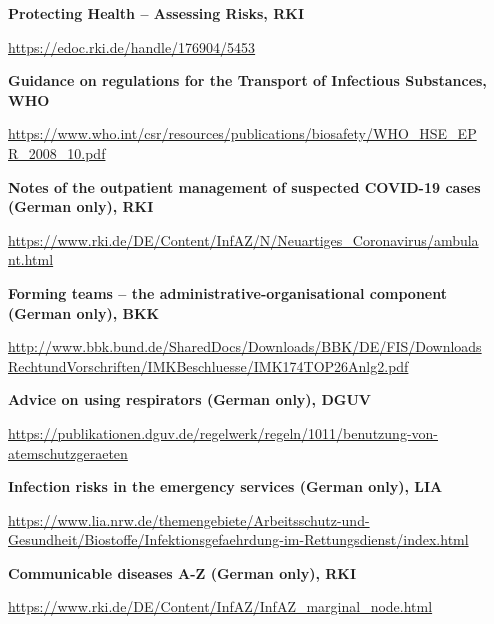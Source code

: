 \documentclass{article}
\begin{document}
\textbf{Protecting Health – Assessing Risks, RKI }


\href{https://edoc.rki.de/handle/176904/5453}{https://edoc.rki.de/handle/176904/5453}


\textbf{Guidance on regulations for the Transport of Infectious Substances, WHO}


\href{https://www.who.int/csr/resources/publications/biosafety/WHO_HSE_EPR_2008_10.pdf?ua=1}{https://www.who.int/csr/resources/publications/biosafety/WHO\_HSE\_EP} \href{https://www.who.int/csr/resources/publications/biosafety/WHO_HSE_EPR_2008_10.pdf?ua=1}{R\_2008\_10.pdf}


\textbf{Notes of the outpatient management of suspected COVID-19 cases (German only), RKI}


\href{https://www.rki.de/DE/Content/InfAZ/N/Neuartiges_Coronavirus/ambulant.html}{https://www.rki.de/DE/Content/InfAZ/N/Neuartiges\_Coronavirus/ambula} \href{https://www.rki.de/DE/Content/InfAZ/N/Neuartiges_Coronavirus/ambulant.html}{nt.html}


\textbf{Forming teams – the administrative-organisational component (German only), BKK}


\href{http://www.bbk.bund.de/SharedDocs/Downloads/BBK/DE/FIS/DownloadsRechtundVorschriften/IMKBeschluesse/IMK174TOP26Anlg2.pdf}{http://www.bbk.bund.de/SharedDocs/Downloads/BBK/DE/FIS/Downloads} \href{http://www.bbk.bund.de/SharedDocs/Downloads/BBK/DE/FIS/DownloadsRechtundVorschriften/IMKBeschluesse/IMK174TOP26Anlg2.pdf}{RechtundVorschriften/IMKBeschluesse/IMK174TOP26Anlg2.pdf}


\textbf{Advice on using respirators (German only), DGUV}


\href{https://publikationen.dguv.de/regelwerk/regeln/1011/benutzung-von-atemschutzgeraeten}{https://publikationen.dguv.de/regelwerk/regeln/1011/benutzung-von-atemschutzgeraeten}


\textbf{Infection risks in the emergency services (German only), LIA} 


\href{https://www.lia.nrw.de/themengebiete/Arbeitsschutz-und-Gesundheit/Biostoffe/Infektionsgefaehrdung-im-Rettungsdienst/index.html}{https://www.lia.nrw.de/themengebiete/Arbeitsschutz-und-Gesundheit/Biostoffe/Infektionsgefaehrdung-im-Rettungsdienst/index.html} 


\textbf{Communicable diseases A-Z (German only), RKI }


\href{https://www.rki.de/DE/Content/InfAZ/InfAZ_marginal_node.html}{https://www.rki.de/DE/Content/InfAZ/InfAZ\_marginal\_node.html}
\end{document}
